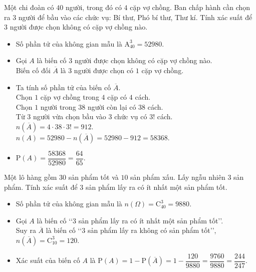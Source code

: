 \begin{vd}
	Một chi đoàn có $40$ người, trong đó có $4$ cặp vợ chồng. Ban chấp hành cần chọn ra $3$ người để bầu vào các chức vụ: Bí thư, Phó bí thư, Thư kí. Tính xác suất để 3 người được chọn không có cặp vợ chồng nào.
	\loigiai
	{
		\begin{itemize}
			\item Số phần tử của không gian mẫu là $\mathrm{A}_{40}^3=52980$.
			\item Gọi $A$ là biến cố $3$ người được chọn không có cặp vợ chồng nào.\\
			Biến cố đối $\overline{A}$ là $3$ người được chọn có $1$ cặp vợ chồng.
			\item Ta tính số phần tử của biến cố $\overline{A}$.\\
			Chọn $1$ cặp vợ chồng trong $4$ cặp có $4$ cách.\\
			Chọn $1$ người trong $38$ người còn lại có $38$ cách.\\
			Từ $3$ người vừa chọn bầu vào $3$ chức vụ có $3!$ cách.\\
			$n(\overline{A})=4\cdot 38 \cdot 3!=912$.\\
			$n(A)=52980-n(\overline{A})=52980-912=58368$.
			\item $\mathrm{P}(A)=\dfrac{58368}{52980}=\dfrac{64}{65}$.
		\end{itemize}
	}
\end{vd}
\begin{vd}
	Một lô hàng gồm $30$ sản phẩm tốt và $10$ sản phẩm xấu. Lấy ngẫu nhiên $3$ sản phẩm. Tính xác suất để $3$ sản phẩm lấy ra có ít nhất một sản phẩm tốt.
	\loigiai
	{
		\begin{itemize}
			\item Số phần tử của không gian mẫu là $n\left(\Omega\right)=\mathrm{C}_{40}^3=9880$.
			\item Gọi $A$ là biến cố \lq\lq $3$ sản phẩm lấy ra có ít nhất một sản phẩm tốt\rq\rq.\\
			Suy ra $\overline{A}$ là biến cố \lq\lq $3$ sản phẩm lấy ra không có sản phẩm tốt\rq\rq,  $n\left(\overline{A}\right)=\mathrm{C}_{10}^3=120$.
			\item Xác suất của biến cố $A$ là $\mathrm{P}(A)=1-\mathrm{P}(\overline{A})=1-\dfrac{120}{9880}=\dfrac{9760}{9880}=\dfrac{244}{247}$.
		\end{itemize}
	}
\end{vd}
